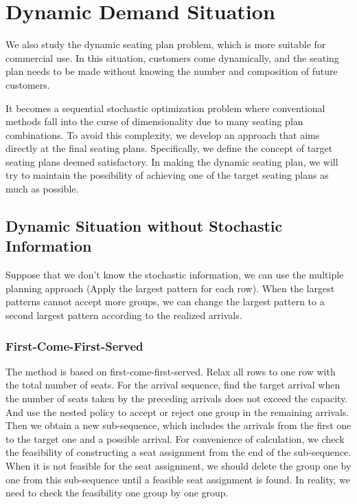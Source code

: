 \section{Dynamic Demand Situation}\label{dynamic_demand}

We also study the dynamic seating plan problem, which is more suitable for commercial use. In this situation, customers come dynamically, and the seating plan needs to be made without knowing the number and composition of future customers. 

It becomes a sequential stochastic optimization problem where conventional methods fall into the curse of dimensionality due to many seating plan combinations. To avoid this complexity, we develop an approach that aims directly at the final seating plans. Specifically, we define the concept of target seating plans deemed satisfactory. In making the dynamic seating plan, we will try to maintain the possibility of achieving one of the target seating plans as much as possible.

\subsection{Dynamic Situation without Stochastic Information}

Suppose that we don't know the stochastic information, we can use the multiple planning approach (Apply the largest pattern for each row). 
When the largest patterns cannot accept more groups, we can change the largest pattern to a second largest pattern according to the realized arrivals.

\subsubsection{First-Come-First-Served}\label{FCFS}

The method is based on first-come-first-served. Relax all rows to one row with the total number of seats. For the arrival sequence, find the target arrival when the number of seats taken by the preceding arrivals does not exceed the capacity. And use the nested policy to accept or reject one group in the remaining arrivals. Then we obtain a new sub-sequence, which includes the arrivals from the first one to the target one and a possible arrival. For convenience of calculation, we check the feasibility of constructing a seat assignment from the end of the sub-sequence. When it is not feasible for the seat assignment, we should delete the group one by one from this sub-sequence until a feasible seat assignment is found. In reality, we need to check the feasibility one group by one group. 

